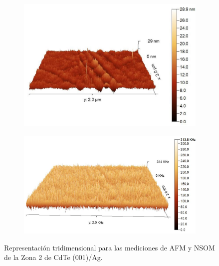 \begin{figure}[H]
    \centering
    \begin{subfigure}[b]{0.45\textwidth}
        \centering
        \includegraphics[width = 1\textwidth]{figures/chap4/cdte-ag/afm-nsom-results/2um/CdTe_Ag_afm_3d.jpg}
    \end{subfigure}\hfill
    \begin{subfigure}[b]{0.45\textwidth}
        \centering
        \includegraphics[width = 1\textwidth]{figures/chap4/cdte-ag/afm-nsom-results/2um/CdTe_Ag_nsom_3d.jpg}
    \end{subfigure}

\caption{Representación tridimensional para las mediciones de AFM y NSOM de la Zona 2 de CdTe (001)/Ag.}
\label{fig:afm-nsom-results-2um-3d}
\end{figure}

